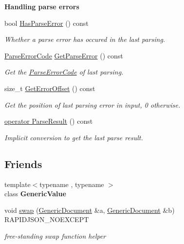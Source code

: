 \begin{Indent}\textbf{ Handling parse errors}\par
\begin{DoxyCompactItemize}
\item 
\mbox{\label{a01996_a510a0588db4eb372f5d81bc3646578fb}} 
bool \hyperlink{a01996_a510a0588db4eb372f5d81bc3646578fb}{Has\+Parse\+Error} () const
\begin{DoxyCompactList}\small\item\em Whether a parse error has occured in the last parsing. \end{DoxyCompactList}\item 
\mbox{\label{a01996_a9400a5bd3169cc6ed545e681ccc06070}} 
\hyperlink{a00635_ga8d4b32dfc45840bca189ade2bbcb6ba7}{Parse\+Error\+Code} \hyperlink{a01996_a9400a5bd3169cc6ed545e681ccc06070}{Get\+Parse\+Error} () const
\begin{DoxyCompactList}\small\item\em Get the \hyperlink{a00635_ga8d4b32dfc45840bca189ade2bbcb6ba7}{Parse\+Error\+Code} of last parsing. \end{DoxyCompactList}\item 
\mbox{\label{a01996_ae1ef7ca99ced428e9300c68e5142afdb}} 
size\+\_\+t \hyperlink{a01996_ae1ef7ca99ced428e9300c68e5142afdb}{Get\+Error\+Offset} () const
\begin{DoxyCompactList}\small\item\em Get the position of last parsing error in input, 0 otherwise. \end{DoxyCompactList}\item 
\hyperlink{a01996_af9bb8eade3eae0c039161378e8d2923a}{operator Parse\+Result} () const
\begin{DoxyCompactList}\small\item\em Implicit conversion to get the last parse result. \end{DoxyCompactList}\end{DoxyCompactItemize}
\end{Indent}
\subsection*{Friends}
\begin{DoxyCompactItemize}
\item 
\mbox{\label{a01996_a899449e1a645b5e377af059fb61113d8}} 
{\footnotesize template$<$typename , typename $>$ }\\class {\bfseries Generic\+Value}
\item 
void \hyperlink{a01996_a0d63efcc43758ac3aed77e868233369d}{swap} (\hyperlink{a01996}{Generic\+Document} \&a, \hyperlink{a01996}{Generic\+Document} \&b) R\+A\+P\+I\+D\+J\+S\+O\+N\+\_\+\+N\+O\+E\+X\+C\+E\+PT
\begin{DoxyCompactList}\small\item\em free-\/standing swap function helper \end{DoxyCompactList}\end{DoxyCompactItemize}
